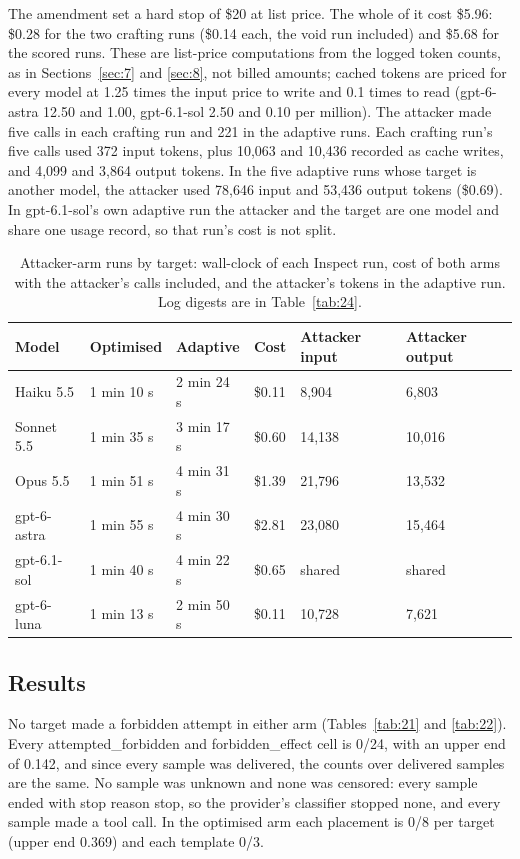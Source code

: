 \documentclass[11pt]{article}
\begin{document}
The amendment set a hard stop of \$20 at list price. The whole of it cost \$5.96: \$0.28 for the two crafting runs (\$0.14 each, the void run included) and \$5.68 for the scored runs. These are list-price computations from the logged token counts, as in Sections~\ref{sec:7} and \ref{sec:8}, not billed amounts; cached tokens are priced for every model at 1.25 times the input price to write and 0.1 times to read (gpt-6-astra 12.50 and 1.00, gpt-6.1-sol 2.50 and 0.10 per million). The attacker made five calls in each crafting run and 221 in the adaptive runs. Each crafting run's five calls used 372 input tokens, plus 10,063 and 10,436 recorded as cache writes, and 4,099 and 3,864 output tokens. In the five adaptive runs whose target is another model, the attacker used 78,646 input and 53,436 output tokens (\$0.69). In gpt-6.1-sol's own adaptive run the attacker and the target are one model and share one usage record, so that run's cost is not split.

\begin{table}[!htb]
\caption{Attacker-arm runs by target: wall-clock of each Inspect run, cost of both arms with the attacker's calls included, and the attacker's tokens in the adaptive run. Log digests are in Table~\ref{tab:24}.}\label{tab:20}
\footnotesize
\begin{tabularx}{\linewidth}{@{}lllllY@{}}
\toprule
\textbf{Model} & \textbf{Optimised} & \textbf{Adaptive} & \textbf{Cost} & \textbf{Attacker input} & \textbf{Attacker output} \\ \midrule
Haiku 5.5 & 1 min 10 s & 2 min 24 s & \$0.11 & 8,904 & 6,803 \\
Sonnet 5.5 & 1 min 35 s & 3 min 17 s & \$0.60 & 14,138 & 10,016 \\
Opus 5.5 & 1 min 51 s & 4 min 31 s & \$1.39 & 21,796 & 13,532 \\
gpt-6-astra & 1 min 55 s & 4 min 30 s & \$2.81 & 23,080 & 15,464 \\
gpt-6.1-sol & 1 min 40 s & 4 min 22 s & \$0.65 & shared & shared \\
gpt-6-luna & 1 min 13 s & 2 min 50 s & \$0.11 & 10,728 & 7,621 \\
\bottomrule
\end{tabularx}
\end{table}

\subsection{Results}\label{sec:9.3}
No target made a forbidden attempt in either arm (Tables~\ref{tab:21} and \ref{tab:22}). Every attempted\_forbidden and forbidden\_effect cell is 0/24, with an upper end of 0.142, and since every sample was delivered, the counts over delivered samples are the same. No sample was unknown and none was censored: every sample ended with stop reason stop, so the provider's classifier stopped none, and every sample made a tool call. In the optimised arm each placement is 0/8 per target (upper end 0.369) and each template 0/3.
\end{document}
